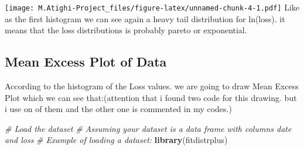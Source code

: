 \documentclass[
  12pt,
]{article}
\newenvironment{Shaded}{\begin{snugshade}}{\end{snugshade}}
\newcommand{\CommentTok}[1]{\textcolor[rgb]{0.56,0.35,0.01}{\textit{#1}}}
\newcommand{\FunctionTok}[1]{\textcolor[rgb]{0.13,0.29,0.53}{\textbf{#1}}}
\newcommand{\NormalTok}[1]{#1}
\begin{document}
\texttt{[image: M.Atighi-Project\_files/figure-latex/unnamed-chunk-4-1.pdf]}
Like as the first histogram we can see again a heavy tail distribution
for ln(loss). it means that the loss distributions is probably pareto or
exponential.

\subsection{Mean Excess Plot of Data}\label{mean-excess-plot-of-data}

According to the histogram of the Loss values. we are going to draw Mean
Excess Plot which we can see that:(attention that i found two code for
this drawing. but i use on of them and the other one is commented in my
codes.)

\begin{Shaded}
\begin{Highlighting}[]
\CommentTok{\# Load the dataset}
\CommentTok{\# Assuming your dataset is a data frame with columns \textquotesingle{}date\textquotesingle{} and \textquotesingle{}loss\textquotesingle{}}
\CommentTok{\# Example of loading a dataset:}
\FunctionTok{library}\NormalTok{(fitdistrplus)}
\end{Highlighting}
\end{Shaded}
\end{document}
